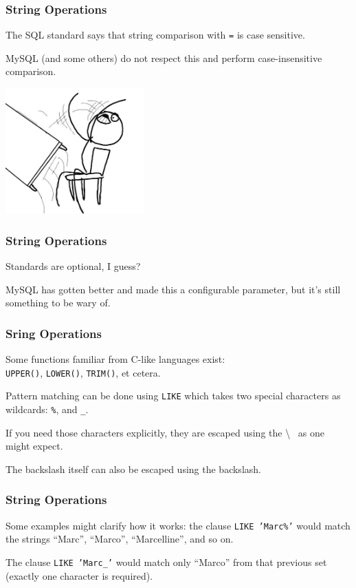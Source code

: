 \begin{frame}
\frametitle{String Operations}

The SQL standard says that string comparison with \texttt{=} is case sensitive.


MySQL (and some others) do not respect this and perform case-insensitive comparison. 

\begin{center}
	\includegraphics[width=0.4\textwidth]{images/table-flip.jpg}
\end{center}

\end{frame}



\begin{frame}
\frametitle{String Operations}


Standards are optional, I guess? 

MySQL has gotten better and made this a configurable parameter, but it's still something to be wary of.


\end{frame}



\begin{frame}
\frametitle{Sring Operations}

Some functions familiar from C-like languages exist:\\
\quad  \texttt{UPPER()}, \texttt{LOWER()}, \texttt{TRIM()}, et cetera. 

Pattern matching can be done using \texttt{LIKE} which takes two special characters as wildcards: \texttt{\%}, and \texttt{\_}.  

If you need those characters explicitly, they are escaped using the \textbackslash~ as one might expect. 

The backslash itself can also be escaped using the backslash.

\end{frame}


\begin{frame}
\frametitle{String Operations}

Some examples might clarify how it works: the clause \texttt{LIKE 'Marc\%'} would match the strings ``Marc'', ``Marco'', ``Marcelline'', and so on. 

The clause \texttt{LIKE 'Marc\_'} would match only ``Marco'' from that previous set (exactly one character is required). 


\end{frame}



